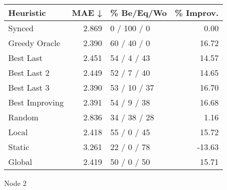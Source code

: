 \begin{tabular}{lrlr}
\toprule
\textbf{Heuristic} & \textbf{MAE ↓} & \textbf{\% Be/Eq/Wo} & \textbf{\% Improv.} \\
\midrule
            Synced &          2.869 &          0 / 100 / 0 &                0.00 \\
     Greedy Oracle &          2.390 &          60 / 40 / 0 &               16.72 \\
         Best Last &          2.451 &          54 / 4 / 43 &               14.57 \\
       Best Last 2 &          2.449 &          52 / 7 / 40 &               14.65 \\
       Best Last 3 &          2.390 &         53 / 10 / 37 &               16.70 \\
    Best Improving &          2.391 &          54 / 9 / 38 &               16.68 \\
            Random &          2.836 &         34 / 38 / 28 &                1.16 \\
             Local &          2.418 &          55 / 0 / 45 &               15.72 \\
            Static &          3.261 &          22 / 0 / 78 &              -13.63 \\
            Global &          2.419 &          50 / 0 / 50 &               15.71 \\
\bottomrule
\end{tabular}
\caption{Node 2}
\label{tab:ds_iid_lr05_le1_bs2_2}
